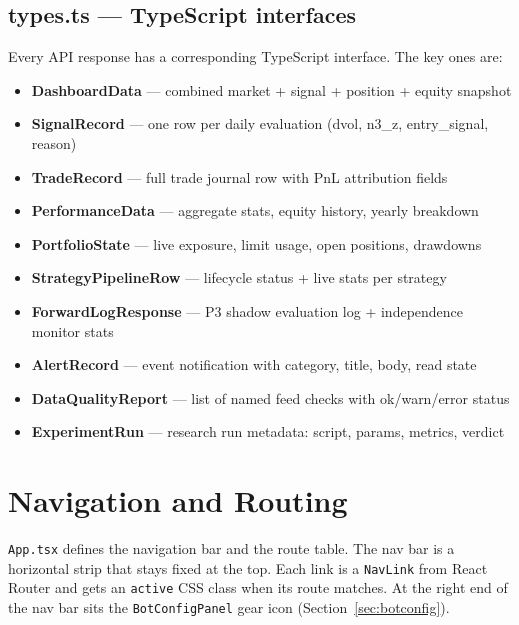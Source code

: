 \documentclass[12pt, a4paper]{article}
\begin{document}
\subsection{types.ts — TypeScript interfaces}

Every API response has a corresponding TypeScript interface. The key ones are:

\begin{itemize}[noitemsep]
  \item \textbf{DashboardData} — combined market + signal + position + equity snapshot
  \item \textbf{SignalRecord} — one row per daily evaluation (dvol, n3\_z, entry\_signal, reason)
  \item \textbf{TradeRecord} — full trade journal row with PnL attribution fields
  \item \textbf{PerformanceData} — aggregate stats, equity history, yearly breakdown
  \item \textbf{PortfolioState} — live exposure, limit usage, open positions, drawdowns
  \item \textbf{StrategyPipelineRow} — lifecycle status + live stats per strategy
  \item \textbf{ForwardLogResponse} — P3 shadow evaluation log + independence monitor stats
  \item \textbf{AlertRecord} — event notification with category, title, body, read state
  \item \textbf{DataQualityReport} — list of named feed checks with ok/warn/error status
  \item \textbf{ExperimentRun} — research run metadata: script, params, metrics, verdict
\end{itemize}


\section{Navigation and Routing}

\texttt{App.tsx} defines the navigation bar and the route table. The nav bar
is a horizontal strip that stays fixed at the top. Each link is a
\texttt{NavLink} from React Router and gets an \texttt{active} CSS class when
its route matches. At the right end of the nav bar sits the \texttt{BotConfigPanel}
gear icon (Section~\ref{sec:botconfig}).
\end{document}
